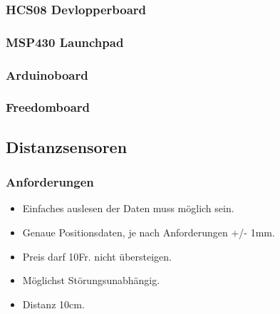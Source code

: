 
\subsubsection{HCS08 Devlopperboard}

\subsubsection{MSP430 Launchpad}
\subsubsection{Arduinoboard}
\subsubsection{Freedomboard}

\subsection*{Distanzsensoren}
\subsubsection{Anforderungen}
\begin{itemize}
\item Einfaches auslesen der Daten muss möglich sein.
\item Genaue Positionsdaten, je nach Anforderungen +/- 1mm.
\item Preis darf 10Fr. nicht übersteigen.
\item Möglichst Störungsunabhängig.
\item Distanz 10cm.
\end{itemize}

